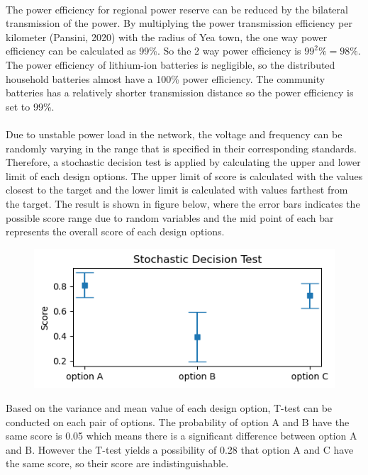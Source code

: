 \documentclass{article}
\begin{document}
\\
The power efficiency for regional power reserve can be reduced by the bilateral transmission of the power. By multiplying the power transmission efficiency per kilometer (Pansini, 2020) with the radius of Yea town, the one way power efficiency can be calculated as 99\%. So the 2 way power efficiency is \(99^2\%=98\%\). The power efficiency of lithium-ion batteries is negligible, so the distributed household batteries almost have a 100\% power efficiency. The community batteries has a relatively shorter transmission distance so the power efficiency is set to 99\%.\\
\\
Due to unstable power load in the network, the voltage and frequency can be randomly varying in the range that is specified in their corresponding standards. Therefore, a stochastic decision test is applied by calculating the upper and lower limit of each design options. The upper limit of score is calculated with the values closest to the target and the lower limit is calculated with values farthest from the target. The result is shown in figure below, where the error bars indicates the possible score range due to random variables and the mid point of each bar represents the overall score of each design options. 
\begin{figure}[H]
\center
\includegraphics[scale=1]{err}
\end{figure}
Based on the variance and mean value of each design option, T-test can be conducted on each pair of options. The probability of option A and B have the same score is 0.05 which means there is a significant difference between option A and B. However the T-test yields a possibility of 0.28 that option A and C have the same score, so their score are indistinguishable.\\
\\
\end{document}
